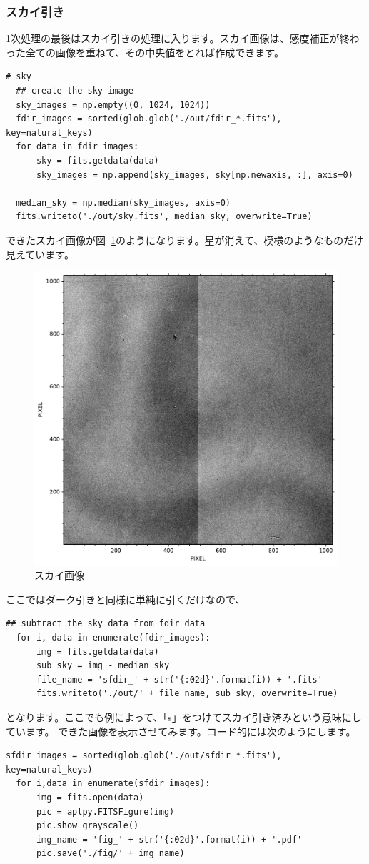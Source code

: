 \subsubsection{スカイ引き}
1次処理の最後はスカイ引きの処理に入ります。スカイ画像は、感度補正が終わった全ての画像を重ねて、その中央値をとれば作成できます。
\begin{lstlisting}[caption=スカイ画像の作成,label=code:sky_image]
  # sky
  ## create the sky image
  sky_images = np.empty((0, 1024, 1024))
  fdir_images = sorted(glob.glob('./out/fdir_*.fits'), key=natural_keys)
  for data in fdir_images:
      sky = fits.getdata(data)
      sky_images = np.append(sky_images, sky[np.newaxis, :], axis=0)
  
  median_sky = np.median(sky_images, axis=0)
  fits.writeto('./out/sky.fits', median_sky, overwrite=True)
\end{lstlisting}

できたスカイ画像が図~\ref{fig:sky_image}のようになります。星が消えて、模様のようなものだけ見えています。
\begin{figure}
  \centering
  \includegraphics[width=0.6\linewidth]{./fig/chap_5/sky_fits.pdf}
  \caption{スカイ画像}
  \label{fig:sky_image}
\end{figure}
ここではダーク引きと同様に単純に引くだけなので、
\begin{lstlisting}[caption=スカイ引き,label=code:subtract_sky]
  ## subtract the sky data from fdir data
  for i, data in enumerate(fdir_images):
      img = fits.getdata(data)
      sub_sky = img - median_sky
      file_name = 'sfdir_' + str('{:02d}'.format(i)) + '.fits'
      fits.writeto('./out/' + file_name, sub_sky, overwrite=True)
\end{lstlisting}
となります。ここでも例によって、「s」をつけてスカイ引き済みという意味にしています。
できた画像を表示させてみます。コード的には次のようにします。
\begin{lstlisting}[caption=作成した画像の表示,label=code:kansei]
  sfdir_images = sorted(glob.glob('./out/sfdir_*.fits'), key=natural_keys)
  for i,data in enumerate(sfdir_images):
      img = fits.open(data)
      pic = aplpy.FITSFigure(img)
      pic.show_grayscale()
      img_name = 'fig_' + str('{:02d}'.format(i)) + '.pdf'
      pic.save('./fig/' + img_name)
\end{lstlisting}

